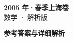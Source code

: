 \documentclass[zihao=-4, a4paper]{ctexart}
\begin{document}
\begin{center}
  {\Large\bfseries 2005 年·春季上海卷}\\[4pt]
  {\large 数学 · 解析版}
\end{center}
\medskip
{}

\clearpage
{}
\begin{center}{\Large\bfseries 参考答案与详细解析}\end{center}
\medskip

\end{document}
